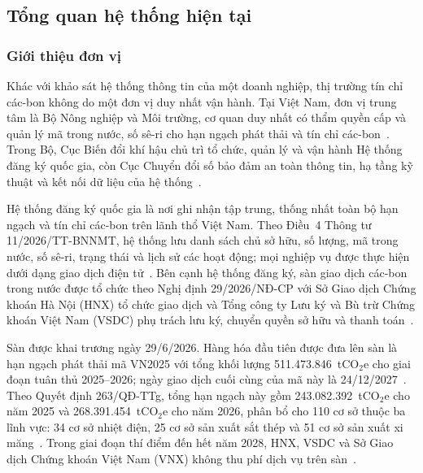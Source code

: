\FloatBarrier
\subsection*{Tổng quan hệ thống hiện tại}
\label{subsec:ks-tongquan}

\subsubsection*{Giới thiệu đơn vị}

Khác với khảo sát hệ thống thông tin của một doanh nghiệp, thị trường tín chỉ các-bon không do một đơn vị duy nhất vận hành. Tại Việt Nam, đơn vị trung tâm là Bộ Nông nghiệp và Môi trường, cơ quan duy nhất có thẩm quyền cấp và quản lý mã trong nước, số sê-ri cho hạn ngạch phát thải và tín chỉ các-bon~\cite{vietnam2026thongtu11}. Trong Bộ, Cục Biến đổi khí hậu chủ trì tổ chức, quản lý và vận hành Hệ thống đăng ký quốc gia, còn Cục Chuyển đổi số bảo đảm an toàn thông tin, hạ tầng kỹ thuật và kết nối dữ liệu của hệ thống~\cite{vietnam2026thongtu11}.

Hệ thống đăng ký quốc gia là nơi ghi nhận tập trung, thống nhất toàn bộ hạn ngạch và tín chỉ các-bon trên lãnh thổ Việt Nam. Theo Điều~4 Thông tư 11/2026/TT-BNNMT, hệ thống lưu danh sách chủ sở hữu, số lượng, mã trong nước, số sê-ri, trạng thái và lịch sử các hoạt động; mọi nghiệp vụ được thực hiện dưới dạng giao dịch điện tử~\cite{vietnam2026thongtu11}. Bên cạnh hệ thống đăng ký, sàn giao dịch các-bon trong nước được tổ chức theo Nghị định 29/2026/NĐ-CP với Sở Giao dịch Chứng khoán Hà Nội (HNX) tổ chức giao dịch và Tổng công ty Lưu ký và Bù trừ Chứng khoán Việt Nam (VSDC) phụ trách lưu ký, chuyển quyền sở hữu và thanh toán~\cite{vietnam2026nghidinh29}.

Sàn được khai trương ngày 29/6/2026. Hàng hóa đầu tiên được đưa lên sàn là hạn ngạch phát thải mã VN2025 với tổng khối lượng 511.473.846~tCO$_2$e cho giai đoạn tuân thủ 2025--2026; ngày giao dịch cuối cùng của mã này là 24/12/2027~\cite{hnx2026vn2025}. Theo Quyết định 263/QĐ-TTg, tổng hạn ngạch này gồm 243.082.392~tCO$_2$e cho năm 2025 và 268.391.454~tCO$_2$e cho năm 2026, phân bổ cho 110 cơ sở thuộc ba lĩnh vực: 34 cơ sở nhiệt điện, 25 cơ sở sản xuất sắt thép và 51 cơ sở sản xuất xi măng~\cite{vietnam2026qd263}. Trong giai đoạn thí điểm đến hết năm 2028, HNX, VSDC và Sở Giao dịch Chứng khoán Việt Nam (VNX) không thu phí dịch vụ trên sàn~\cite{vietnam2026nghidinh29}.


